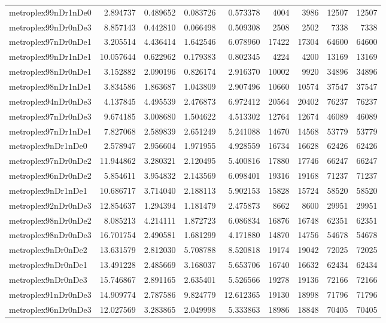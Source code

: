 \begin{longtable}{|l|r|r|r|r|r|r|r|r|}
metroplex99nDr1nDe0 & 2.894737 & 0.489652 & 0.083726 & 0.573378 & 4004 & 3986 & 12507 & 12507 \\
metroplex99nDr0nDe3 & 8.857143 & 0.442810 & 0.066498 & 0.509308 & 2508 & 2502 & 7338 & 7338 \\
metroplex97nDr0nDe1 & 3.205514 & 4.436414 & 1.642546 & 6.078960 & 17422 & 17304 & 64600 & 64600 \\
metroplex99nDr1nDe1 & 10.057644 & 0.622962 & 0.179383 & 0.802345 & 4224 & 4200 & 13169 & 13169 \\
metroplex98nDr0nDe1 & 3.152882 & 2.090196 & 0.826174 & 2.916370 & 10002 & 9920 & 34896 & 34896 \\
metroplex98nDr1nDe1 & 3.834586 & 1.863687 & 1.043809 & 2.907496 & 10660 & 10574 & 37547 & 37547 \\
metroplex94nDr0nDe3 & 4.137845 & 4.495539 & 2.476873 & 6.972412 & 20564 & 20402 & 76237 & 76237 \\
metroplex97nDr0nDe3 & 9.674185 & 3.008680 & 1.504622 & 4.513302 & 12764 & 12674 & 46089 & 46089 \\
metroplex97nDr1nDe1 & 7.827068 & 2.589839 & 2.651249 & 5.241088 & 14670 & 14568 & 53779 & 53779 \\
metroplex9nDr1nDe0 & 2.578947 & 2.956604 & 1.971955 & 4.928559 & 16734 & 16628 & 62426 & 62426 \\
metroplex97nDr0nDe2 & 11.944862 & 3.280321 & 2.120495 & 5.400816 & 17880 & 17746 & 66247 & 66247 \\
metroplex96nDr0nDe2 & 5.854611 & 3.954832 & 2.143569 & 6.098401 & 19316 & 19168 & 71237 & 71237 \\
metroplex9nDr1nDe1 & 10.686717 & 3.714040 & 2.188113 & 5.902153 & 15828 & 15724 & 58520 & 58520 \\
metroplex92nDr0nDe3 & 12.854637 & 1.294394 & 1.181479 & 2.475873 & 8662 & 8600 & 29951 & 29951 \\
metroplex98nDr0nDe2 & 8.085213 & 4.214111 & 1.872723 & 6.086834 & 16876 & 16748 & 62351 & 62351 \\
metroplex98nDr0nDe3 & 16.701754 & 2.490581 & 1.681299 & 4.171880 & 14870 & 14756 & 54678 & 54678 \\
metroplex9nDr0nDe2 & 13.631579 & 2.812030 & 5.708788 & 8.520818 & 19174 & 19042 & 72025 & 72025 \\
metroplex9nDr0nDe1 & 13.491228 & 2.485669 & 3.168037 & 5.653706 & 16740 & 16632 & 62434 & 62434 \\
metroplex9nDr0nDe3 & 15.746867 & 2.891165 & 2.635401 & 5.526566 & 19278 & 19136 & 72166 & 72166 \\
metroplex91nDr0nDe3 & 14.909774 & 2.787586 & 9.824779 & 12.612365 & 19130 & 18998 & 71796 & 71796 \\
metroplex96nDr0nDe3 & 12.027569 & 3.283865 & 2.049998 & 5.333863 & 18986 & 18848 & 70405 & 70405 \\
\end{longtable}
